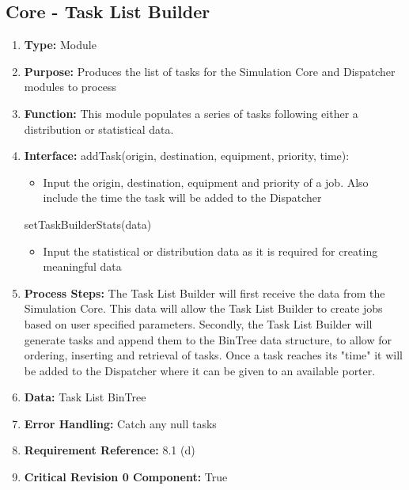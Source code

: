 \documentclass[paper=letter, fontsize=10pt]{scrartcl}
\numberwithin{equation}{section}		%
\numberwithin{figure}{section}			%
\numberwithin{table}{section}				%
\begin{document}
\subsection{Core - Task List Builder}
\begin{enumerate}[]
	\item \textbf{Type:} Module
	\item \textbf{Purpose:} Produces the list of tasks for the Simulation Core and Dispatcher modules to process
	\item \textbf{Function:} This module populates a series of tasks following either a distribution or statistical data.
	\item \textbf{Interface:} \newline
		addTask(origin, destination, equipment, priority, time):
		\begin{itemize}
			\item Input the origin, destination, equipment and priority of a job.  Also include the time the task will be added to the Dispatcher
		\end{itemize}
		setTaskBuilderStats(data)
		\begin{itemize}
			\item Input the statistical or distribution data as it is required for creating meaningful data
		\end{itemize}
		
	\item \textbf{Process Steps:} The Task List Builder will first receive the data from the Simulation Core.  This data will allow the Task List Builder to create jobs based on user specified parameters.  Secondly, the Task List Builder will generate tasks and append them to the BinTree data structure, to allow for ordering, inserting and retrieval of tasks.  Once a task reaches its "time" it will be added to the Dispatcher where it can be given to an available porter.
	\item \textbf{Data:} Task List BinTree
	\item \textbf{Error Handling:} Catch any null tasks
	\item \textbf{Requirement Reference:} 8.1 (d)
	\item \textbf{Critical Revision 0 Component:} True
\end{enumerate}
\end{document}
